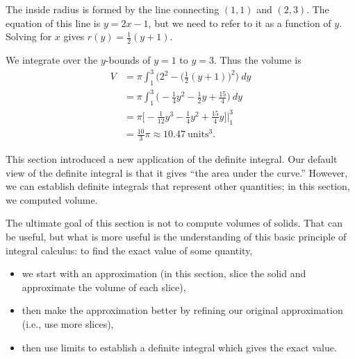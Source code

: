 \begin{solution}
{The inside radius is formed by the line connecting $(1,1)$ and $(2,3)$. The equation of this line is $y=2x-1$, but we need to refer to it as a function of $y$. Solving for $x$ gives $r(y) = \frac12(y+1)$. 

We integrate over the $y$-bounds of $y=1$ to $y=3$. Thus the volume is
\begin{align*}
V 	&=	\pi\int_1^3\Big(2^2 - \big(\frac12(y+1)\big)^2\Big)\ dy \\
		&=	\pi\int_1^3\Big(-\frac14y^2-\frac12y+\frac{15}4\Big)\ dy \\
		&= 	\pi\Big[-\frac1{12}y^3-\frac14y^2+\frac{15}4y\Big]\Big|_1^3\\
		&= \frac{10}3\pi \approx 10.47\ \text{units}^3.
\end{align*}
}
\end{solution}



%
This section introduced a new application of the definite integral. Our default view of the definite integral is that it gives ``the area under the curve.'' However, we can establish definite integrals that represent other quantities; in this section, we computed volume.

The ultimate goal of this section is not to compute volumes of solids. That can be useful, but what is more useful is the understanding of this basic principle of integral calculus: to find the exact value of some quantity, 
\begin{itemize}
	\item we start with an approximation (in this section, slice the solid and approximate the volume of each slice), 
	\item then make the approximation better by refining our original approximation (i.e., use more slices), 
	\item	then use limits to establish a definite integral which gives the exact value.
\end{itemize}
%































